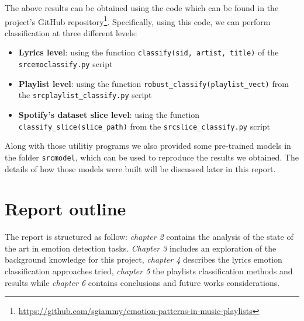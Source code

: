 The above results can be obtained using the code which can be found in the project's GitHub repository\footnote{\url{https://github.com/sgiammy/emotion-patterns-in-music-playlists}}. Specifically, using this code, we can perform classification at three different levels:
\begin{itemize}
\item \textbf{Lyrics level}: using the function \texttt{classify(sid, artist, title)} of the \texttt{src\/emoclassify.py} script
\item \textbf{Playlist level}: using the function \texttt{robust\_classify(playlist\_vect)} from the \texttt{src\/playlist\_classify.py} script
\item \textbf{Spotify's dataset slice level}: using the function \texttt{classify\_slice(slice\_path)} from the \texttt{src\/slice\_classify.py} script
\end{itemize}

Along with those utilitiy programs we also provided some pre-trained models in the folder \texttt{src\/model}, which can be used to reproduce the results we obtained. The details of how those models were built will be discussed later in this report.

\section{Report outline}

The report is structured as follow: \textit{chapter 2} contains the analysis of the state of the art in emotion detection tasks. \textit{Chapter 3} includes an exploration of the background knowledge for this project, \textit{chapter 4} describes the lyrics emotion classification approaches tried, \textit{chapter 5} the playlists classification methods and results while \textit{chapter 6} contains conclusions and future works considerations. 